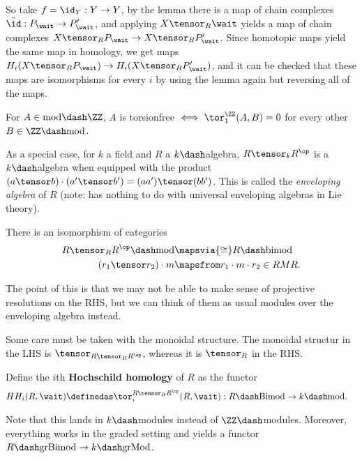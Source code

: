 So take \(f = \id_Y: Y\to Y\), by the lemma there is a map of chain
complexes \(\tilde \id: P_\wait \to P_\wait'\), and applying
\(X\tensor_R \wait\) yields a map of chain complexes
\(X\tensor_R P_\wait \to X\tensor_R P_\wait'\). Since homotopic maps
yield the same map in homology, we get maps
\(H_i(X\tensor_R P_\wait) \to H_i(X\tensor_R P_\wait')\), and it can be
checked that these maps are isomorphisms for every \(i\) by using the
lemma again but reversing all of the maps.

\begin{description}
\tightlist
\item[Remark]
For \(A\in \text{mod}\dash\ZZ\), \(A\) is torsionfree
\(\iff \tor_1^\ZZ(A, B) = 0\) for every other
\(B\in \ZZ\dash\text{mod}\).
\end{description}

As a special case, for \(k\) a field and \(R\) a \(k\dash\)algebra,
\(R\tensor_k R^\op\) is a \(k\dash\)algebra when equipped with the
product \((a\tensor b)\cdot(a'\tensor b') = (aa') \tensor (bb')\). This
is called the \emph{enveloping algebra} of \(R\) (note: has nothing to
do with universal enveloping algebras in Lie theory).

There is an isomorphism of categories \begin{align*}
R\tensor_R R^\op\dash\text{mod} &\mapsvia{\cong} R\dash\text{bimod} \\
(r_1\tensor r_2) \cdot m &\mapsfrom
r_1 \cdot m \cdot r_2 \in RMR 
.\end{align*}

The point of this is that we may not be able to make sense of projective
resolutions on the RHS, but we can think of them as usual modules over
the enveloping algebra instead.

\begin{description}
\tightlist
\item[Warning]
Some care must be taken with the monoidal structure. The monoidal
structur in the LHS is \(\tensor_{R\tensor_R R^\op}\), whereas it is
\(\tensor_R\) in the RHS.
\end{description}

Define the \(i\)th \textbf{Hochschild homology} of \(R\) as the functor
\begin{align*}
HH_i(R, \wait) \definedas \tor_i^{R\tensor_R R^\op}(R, \wait) : R\dash\text{Bimod} &\to k\dash\text{mod}
.\end{align*}

Note that this lands in \(k\dash\)modules instead of
\(\ZZ\dash\)modules. Moreover, everything works in the graded setting
and yields a functor \(R\dash\text{grBimod} \to k\dash\text{grMod}\).


